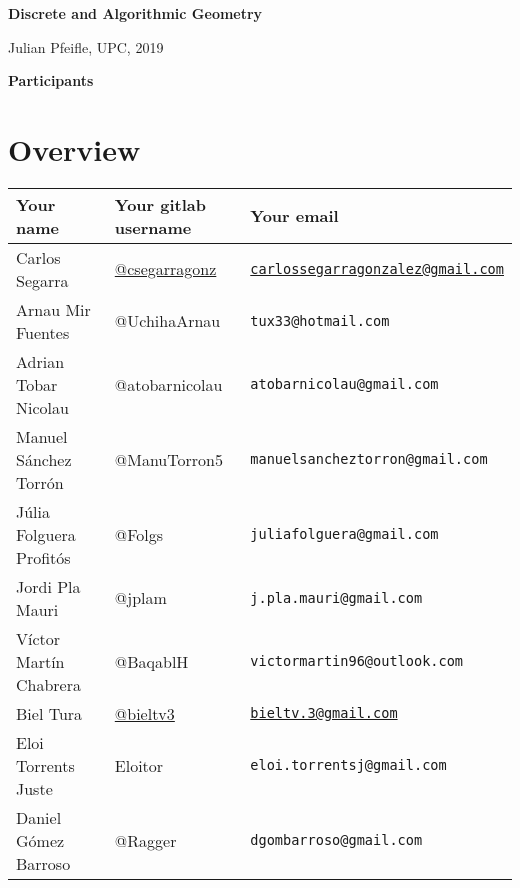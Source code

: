 \documentclass[11pt]{amsart}
\begin{document}
\begin{center}
\textbf{\sffamily
   Discrete and Algorithmic Geometry }

\medskip
   Julian Pfeifle,
   UPC, 2019
\end{center}

\bigskip

\begin{center}
  \textbf{\sffamily Participants}
\end{center}

\medskip

\section*{Overview}

\begin{center}
  \begin{tabular}[c]{lll}
    Your name
    & Your gitlab username
    & Your email
    \\\hline
    Carlos Segarra
    & \href{https://gitlab.com/csegarragonz}{@csegarragonz}
    & \texttt{\href{mailto:carlossegarragonzalez@gmail.com}{carlossegarragonzalez@gmail.com}}
    \\\hline
    Arnau Mir Fuentes
    & @UchihaArnau
    & \texttt{tux33@hotmail.com}
    \\\hline
    Adrian Tobar Nicolau
    & @atobarnicolau
    & \texttt{atobarnicolau@gmail.com}
    \\\hline
    Manuel Sánchez Torrón
    & @ManuTorron5
    & \texttt{manuelsancheztorron@gmail.com}
    \\\hline
    Júlia Folguera Profitós
    & @Folgs
    & \texttt{juliafolguera@gmail.com}
    \\\hline
    Jordi Pla Mauri
    & @jplam
    & \texttt{j.pla.mauri@gmail.com}
    \\\hline
    Víctor Martín Chabrera
    & @BaqablH
    & \texttt{victormartin96@outlook.com}
    \\\hline
    Biel Tura
    & \href{https://gitlab.com/bieltv3}{@bieltv3}
    & \texttt{\href{mailto:bieltv.3@gmail.com}{bieltv.3@gmail.com}}
    \\\hline
    Eloi Torrents Juste
    & Eloitor
    & \texttt{eloi.torrentsj@gmail.com}
    \\\hline
    Daniel Gómez Barroso
    & @Ragger
    & \texttt{dgombarroso@gmail.com}
    \\\hline
  \end{tabular}
\end{center}
\end{document}
